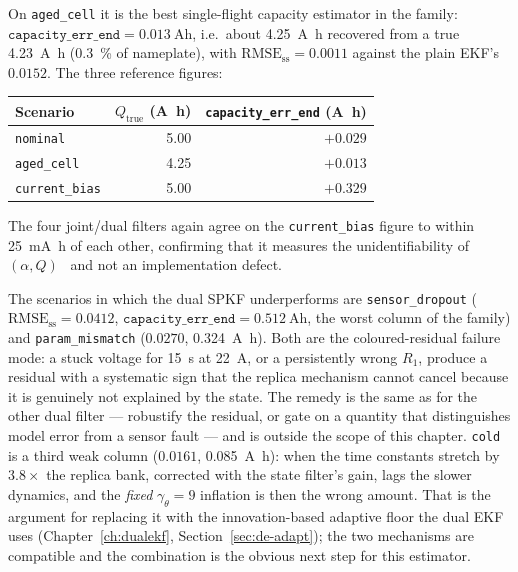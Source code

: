 On \texttt{aged\_cell} it is the best single-flight capacity estimator in the family:
$\texttt{capacity\_err\_end}=\SI{+0.013}{\ampere\hour}$, i.e.\ about \SI{4.25}{\ampere\hour}
recovered from a true \SI{4.23}{\ampere\hour} (\SI{0.3}{\percent} of nameplate), with
$\text{RMSE}_\text{ss}=0.0011$ against the plain EKF's $0.0152$.  The three reference figures:
\begin{center}
\begin{tabular}{@{}lrr@{}}
\toprule
Scenario & $Q_\text{true}$ (\si{\ampere\hour}) & \texttt{capacity\_err\_end} (\si{\ampere\hour})\\
\midrule
\texttt{nominal}      & 5.00 & $+0.029$\\
\texttt{aged\_cell}   & 4.25 & $+0.013$\\
\texttt{current\_bias}& 5.00 & $+0.329$\\
\bottomrule
\end{tabular}
\end{center}
The four joint/dual filters again agree on the \texttt{current\_bias} figure to within
\SI{25}{\milli\ampere\hour} of each other, confirming that it measures the unidentifiability of
$(\alpha,Q)$~\cite{zhao2017observability,lin2018sensorbias} and not an implementation defect.

The scenarios in which the dual SPKF underperforms are \texttt{sensor\_dropout}
($\text{RMSE}_\text{ss}=0.0412$, $\texttt{capacity\_err\_end}=\SI{+0.512}{\ampere\hour}$, the worst
column of the family) and \texttt{param\_mismatch} ($0.0270$, \SI{+0.324}{\ampere\hour}).  Both are
the coloured-residual failure mode: a stuck voltage for \SI{15}{\second} at \SI{22}{\ampere}, or a
persistently wrong $R_1$, produce a residual with a systematic sign that the replica mechanism
cannot cancel because it is genuinely not explained by the state.  The remedy is the same as for the
other dual filter --- robustify the residual, or gate on a quantity that distinguishes model error
from a sensor fault --- and is outside the scope of this chapter.  \texttt{cold} is a third weak column ($0.0161$, \SI{+0.085}{\ampere\hour}): when the time
constants stretch by $3.8\times$ the replica bank, corrected with the state filter's gain, lags the
slower dynamics, and the \emph{fixed} $\gamma_\theta=9$ inflation is then the wrong amount.  That is
the argument for replacing it with the innovation-based adaptive floor the dual EKF uses
(Chapter~\ref{ch:dualekf}, Section~\ref{sec:de-adapt}); the two mechanisms are compatible and the
combination is the obvious next step for this estimator.

